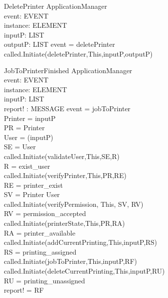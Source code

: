 \begin{schema}{DeletePrinter}
\Delta ApplicationManager \\
event: EVENT \\
instance: ELEMENT \\
inputP: LIST \\
outputP: LIST
\where event = deletePrinter \\
called.Initiate(deletePrinter,This,inputP,outputP)
\end{schema}


\begin{schema}{JobToPrinterFinished}
\Delta ApplicationManager \\
event: EVENT \\
instance: ELEMENT \\
inputP: LIST \\
report! : MESSAGE
\where event = jobToPrinter \\
Printer = \head inputP \\
PR = \lseq Printer \rseq \\
User = \head (\tail inputP) \\
SE = \lseq User \rseq \\
called.Initiate(validateUser,This,SE,R) \\
R = exist\_user \\
called.Initiate(verifyPrinter,This,PR,RE) \\
RE = printer\_exist \\

SV = \lseq Printer User \rseq \\
called.Initiate(verifyPermission, This, SV, RV) \\
RV = permission\_accepted \\

called.Initiate(printerState,This,PR,RA) \\
RA = printer\_available \\

called.Initiate(addCurrentPrinting,This,inputP,RS) \\
RS = printing\_assigned \\

called.Initiate(jobToPrinter,This,inputP,RF) \\

called.Initiate(deleteCurrentPrinting,This,inputP,RU) \\
RU = printing\_unassigned \\

report! = RF
\end{schema}

